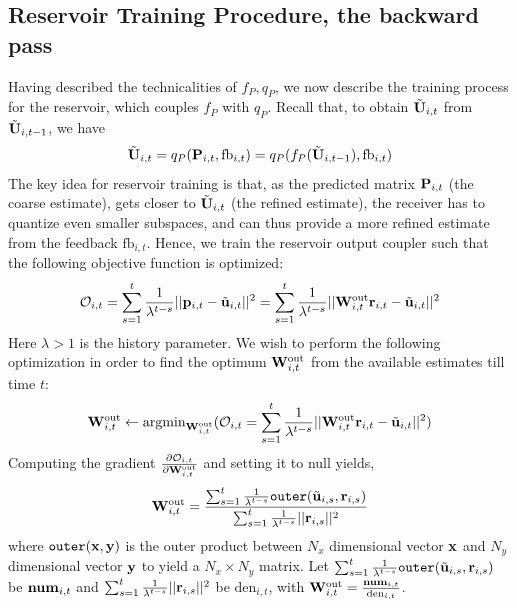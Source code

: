 \documentclass[conference]{IEEEtran}
\begin{document}
\subsection{Reservoir Training Procedure, the backward pass}
\label{train}
\noindent Having described the technicalities of $f_P,q_P$, we now describe the training process for the reservoir, which couples $f_P$ with $q_P$.
Recall that, to obtain $\tilde{{\bf U}}_{i,t}$ from  $\tilde{{\bf U}}_{i,t-1}$, we have
\begin{equation}
\tilde{\bU}_{i,t}=q_P(\bP_{i,t},\text{fb}_{i,t})=q_P(f_P(\tilde{\bU}_{i,t-1}),\text{fb}_{i,t})
\label{fpqp}
\end{equation}
The key idea for reservoir training is that, as the predicted matrix ${\bf P}_{i,t}$ (the coarse estimate), gets closer to $\tilde{{\bf U}}_{i,t}$ (the refined estimate), the receiver has to quantize even smaller subspaces, and can thus provide a more refined estimate from the feedback $\text{fb}_{i,t}$.
Hence, we train the reservoir output coupler such that the following objective function is optimized:
\begin{equation}
\mathcal{O}_{i,t}=\sum_{s=1}^{t}\frac{1}{\lambda^{t-s}}||\bp_{i,t}-\tilde{\bu}_{i,t}||^2=\sum_{s=1}^{t}\frac{1}{\lambda^{t-s}}||\bW_{i,t}^{\text{out}}\br_{i,t}-\tilde{\bu}_{i,t}||^2
\label{oit}
\end{equation}
Here $\lambda>1$ is the history parameter.
We wish to perform the following optimization in order to find the optimum ${\bf W}_{i,t}^{\text{out}}$ from the available estimates till time $t$:
\begin{equation}
\bW_{i,t}^{\text{out}}\gets\text{argmin}_{\bW_{i,t}^{\text{out}}}(\mathcal{O}_{i,t}=\sum_{s=1}^{t}\frac{1}{\lambda^{t-s}}||\bW_{i,t}^{\text{out}}\br_{i,t}-\tilde{\bu}_{i,t}||^2)
\label{getsOpt}
\end{equation}
Computing the gradient $\frac{\partial \mathcal{O}_{i,t}}{\partial {\bf W}_{i,t}^{\text{out}}}$ and setting it to null yields,
\begin{equation}
\bW_{i,t}^{\text{out}}=\frac{\sum_{s=1}^{t}\frac{1}{\lambda^{t-s}}\texttt{outer}(\tilde{\bu}_{i,s},\br_{i,s})}{\sum_{s=1}^{t}\frac{1}{\lambda^{t-s}}||\br_{i,s}||^2}
\label{backpass}
\end{equation}
where $\texttt{outer}({\bf x},{\bf y})$ is the outer product between $N_x$ dimensional vector ${\bf x}$ and $N_y$ dimensional vector ${\bf y}$ to yield a $N_x\times N_y$ matrix.
Let $\sum_{s=1}^{t}\frac{1}{\lambda^{t-s}}\texttt{outer}(\tilde{{\bf u}}_{i,s},{\bf r}_{i,s})$ be $\text{\textbf{num}}_{i,t}$ and $\sum_{s=1}^{t}\frac{1}{\lambda^{t-s}}||{\bf r}_{i,s}||^2$ be $\text{den}_{i,t}$, with ${\bf W}_{i,t}^{\text{out}}=\frac{\text{\textbf{num}}_{i,t}}{\text{den}_{i,t}}$.
\end{document}
